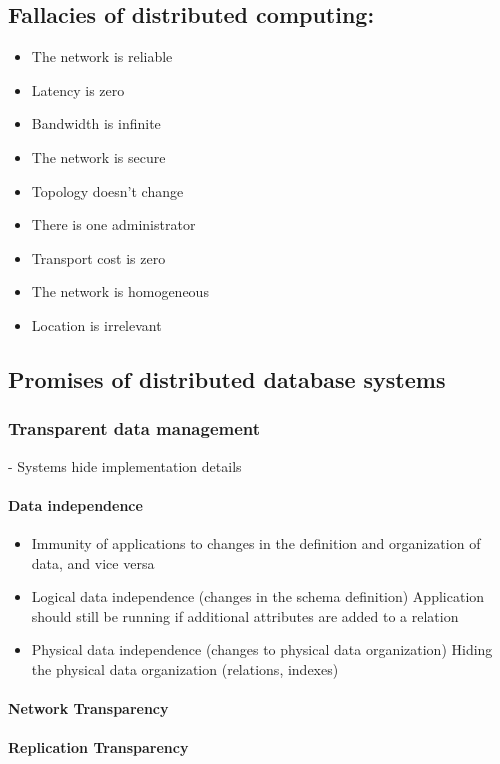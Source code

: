 \documentclass[10pt,a4paper]{article}
\begin{document}
\subsection{Fallacies of distributed computing:}
	\begin{itemize}
		\item The network is reliable
		\item Latency is zero
		\item Bandwidth is infinite
		\item The network is secure
		\item Topology doesn't change
		\item There is one administrator
		\item Transport cost is zero
		\item The network is homogeneous
		\item Location is irrelevant
	\end{itemize}

\subsection{Promises of distributed database systems}
	\subsubsection{Transparent data management} - Systems hide implementation details
	\paragraph{Data independence}
		\begin{itemize}
			\item Immunity of applications to changes in the definition and organization of
			data, and vice versa
			\item Logical data independence (changes in the schema definition)
			Application should still be running if additional attributes are added to a
			relation
			\item Physical data independence (changes to physical data organization)
			Hiding the physical data organization (relations, indexes)
		\end{itemize}
	\paragraph{Network Transparency}
	\paragraph{Replication Transparency}
\end{document}
